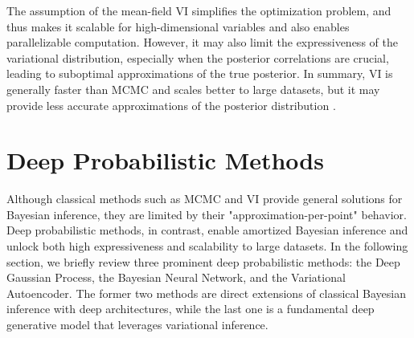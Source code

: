 The assumption of the mean-field \ac{VI} simplifies the optimization problem, and thus makes it scalable for high-dimensional variables and also enables parallelizable computation. However, it may also limit the expressiveness of the variational distribution, especially when the posterior correlations are crucial, leading to suboptimal approximations of the true posterior. In summary, \ac{VI} is generally faster than \ac{MCMC} and scales better to large datasets, but it may provide less accurate approximations of the posterior distribution \citep{Blei_2017}. 

\section{Deep Probabilistic Methods}
\label{sec:introduction:background:deep_probabilistic_methods}
Although classical methods such as \ac{MCMC} and \ac{VI} provide general solutions for Bayesian inference, they are limited by their "approximation-per-point" behavior. Deep probabilistic methods, in contrast, enable amortized Bayesian inference and unlock both high expressiveness and scalability to large datasets. In the following section, we briefly review three prominent deep probabilistic methods: the Deep Gaussian Process, the Bayesian Neural Network, and the Variational Autoencoder. The former two methods are direct extensions of classical Bayesian inference with deep architectures, while the last one is a fundamental deep generative model that leverages variational inference.

